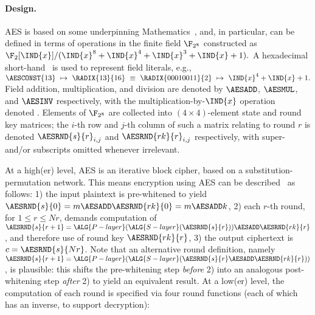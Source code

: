 
\paragraph{Design.}

AES is based on some underpinning Mathematics~\cite[Section 4]{FIPS:197},
and, in particular, can be defined in terms of 
operations in the finite field $\F_{2^{  8}}$ constructed as
$
\F_{2}[\IND{x}] / ( \IND{x}^{8} + \IND{x}^{4} + \IND{x}^{3} + \IND{x} + 1 ) .
$
A hexadecimal short-hand~\cite[Section 3.2]{FIPS:197} is used to represent 
field literals, e.g.,
$
\AESCONST{13} ~\mapsto~ \RADIX{13}{16} ~\equiv~ \RADIX{00010011}{2} ~\mapsto~ \IND{x}^4 + \IND{x} + 1 .
$
Field 
      addition, 
multiplication, 
and  
      division
are denoted by
$\AESADD$,
$\AESMUL$,
and
$\AESINV$
respectively,
with the multiplication-by-$\IND{x}$ operation~\cite[Section 4.2.1]{FIPS:197} 
denoted .
Elements of $\F_{2^8}$ are collected into $( 4 \times 4 )$-element state
and round key matrices; the $i$-th row and $j$-th column of such a matrix 
relating to round $r$ is denoted
$\AESRND {s}{r}_{i,j}$
and
$\AESRND{rk}{r}_{i,j}$
respectively, with super- and/or subscripts omitted whenever irrelevant.

At a high(er) level, 
AES is an iterative block cipher, based on a substitution-permutation network.
This means encryption using AES can be described~\cite[Section 5.2]{FIPS:197}
as follows:
1)    the  input  plaintext is pre-whitened to yield
      $\AESRND {s}{  0} = m \AESADD \AESRND{rk}{0} = m \AESADD k$,
2)    each $r$-th round, for $1 \leq r \leq Nr$, demands computation of
      $\AESRND {s}{r+1} = \ALG{P-layer}( \ALG{S-layer}( \AESRND{s}{r}                        ) ) \AESADD \AESRND{rk}{r}$,
      and therefore use of round key
      $\AESRND{rk}{r  }$,
3)    the output ciphertext is
      $c = \AESRND{s}{Nr}$.
Note that an alternative round definition, namely
      $\AESRND {s}{r+1} = \ALG{P-layer}( \ALG{S-layer}( \AESRND{s}{r} \AESADD \AESRND{rk}{r} ) )                       $ ,
is plausible: this shifts the 
 pre-whitening step {\em before} 2) 
into an analogous 
post-whitening step {\em  after} 2)
to yield an equivalent result.
At a  low(er) level,
the computation of each round is specified via four round functions (each of 
which has an inverse, to support decryption):

